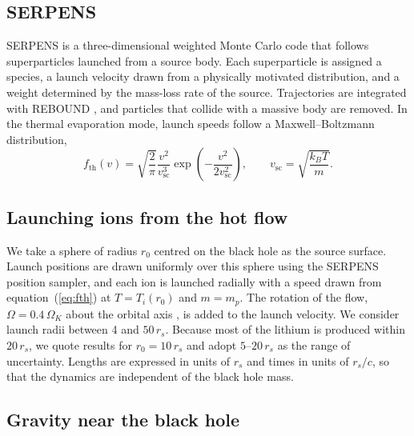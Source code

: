 \documentclass[twocolumn,showpacs,preprintnumbers,amsmath,amssymb]{revtex4}
\begin{document}
\subsection{SERPENS}

SERPENS \cite{Meyer_zu_Westram} is a three-dimensional weighted Monte Carlo code that follows superparticles launched from a source body. Each superparticle is assigned a species, a launch velocity drawn from a physically motivated distribution, and a weight determined by the mass-loss rate of the source. Trajectories are integrated with REBOUND \cite{Rein_Liu_2012}, and particles that collide with a massive body are removed. In the thermal evaporation mode, launch speeds follow a Maxwell--Boltzmann distribution,
\begin{equation}
\label{eq:fth}
f_{\mathrm{th}}(v)=\sqrt{\frac{2}{\pi}} \frac{v^2}{v_{\mathrm{sc}}^3} \exp \left(-\frac{v^2}{2 v_{\mathrm{sc}}^2}\right), \qquad v_{\mathrm{sc}}=\sqrt{\frac{k_B T}{m}} .
\end{equation}

\subsection{Launching ions from the hot flow}

We take a sphere of radius $r_0$ centred on the black hole as the source surface. Launch positions are drawn uniformly over this sphere using the SERPENS position sampler, and each ion is launched radially with a speed drawn from equation~(\ref{eq:fth}) at $T = T_i(r_0)$ and $m=m_p$. The rotation of the flow, $\Omega = 0.4\,\Omega_K$ about the orbital axis \cite{NMQ1998}, is added to the launch velocity. We consider launch radii between 4 and $50\,r_s$. Because most of the lithium is produced within $20\,r_s$, we quote results for $r_0 = 10\,r_s$ and adopt $5$--$20\,r_s$ as the range of uncertainty. Lengths are expressed in units of $r_s$ and times in units of $r_s/c$, so that the dynamics are independent of the black hole mass.

\subsection{Gravity near the black hole}
\end{document}
